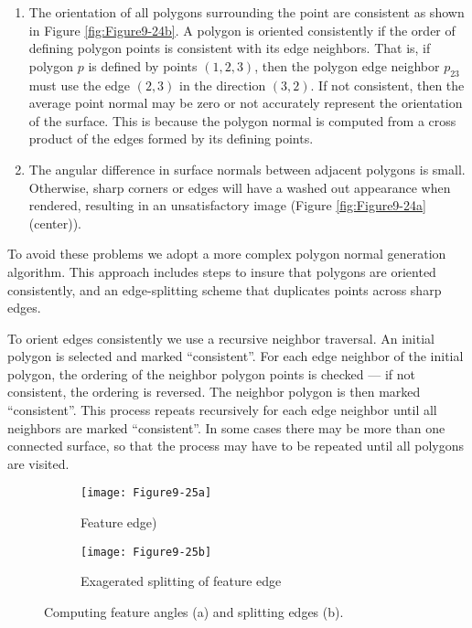 \begin{enumerate}

\item The orientation of all polygons surrounding the point are consistent as shown in Figure \ref{fig:Figure9-24b}. A polygon is oriented consistently if the order of defining polygon points is consistent with its edge neighbors. That is, if polygon $p$ is defined by points $(1,2,3)$, then the polygon edge neighbor $p_{23}$ must use the edge $(2,3)$ in the direction $(3,2)$. If not consistent, then the average point normal may be zero or not accurately represent the orientation of the surface. This is because the polygon normal is computed from a cross product of the edges formed by its defining points.

\item The angular difference in surface normals between adjacent polygons is small. Otherwise, sharp corners or edges will have a washed out appearance when rendered, resulting in an unsatisfactory image (Figure \ref{fig:Figure9-24a}(center)).

\end{enumerate}

To avoid these problems we adopt a more complex polygon normal generation algorithm. This approach includes steps to insure that polygons are oriented consistently, and an edge-splitting scheme that duplicates points across sharp edges.

To orient edges consistently we use a recursive neighbor traversal. An initial polygon is selected and marked ``consistent''. For each edge neighbor of the initial polygon, the ordering of the neighbor polygon points is checked --- if not consistent, the ordering is reversed. The neighbor polygon is then marked ``consistent''. This process repeats recursively for each edge neighbor until all neighbors are marked ``consistent''. In some cases there may be more than one connected surface, so that the process may have to be repeated until all polygons are visited.

\begin{figure}[htb]
    \centering
	\begin{subfigure}[h]{0.48\linewidth}
		\texttt{[image: Figure9-25a]}
		\captionsetup{justification=centering}
		\caption{Feature edge)}
		\label{fig:Figure9-25a}
	\end{subfigure}
	\hfill
	\begin{subfigure}[h]{0.48\linewidth}
		\texttt{[image: Figure9-25b]}
		\captionsetup{justification=centering}
		\caption{Exagerated splitting of feature edge}
		\label{fig:Figure9-25b}
	\end{subfigure}
	\caption{Computing feature angles (a) and splitting edges (b).}\label{fig:Figure9-25}
\end{figure}

